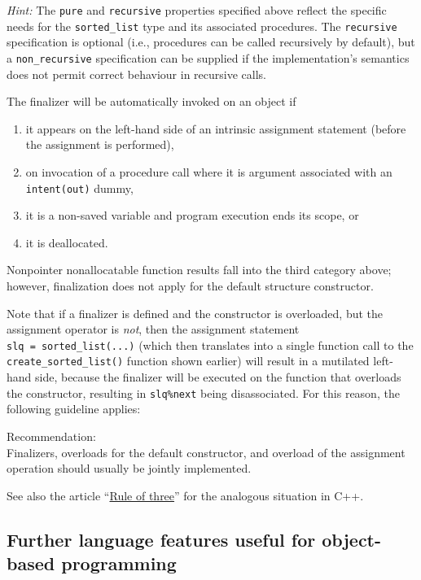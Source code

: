 \documentclass[
  paper=a4,
  ,captions=tableheading
]{scrartcl}
\providecommand{\tightlist}{%
  \setlength{\itemsep}{0pt}\setlength{\parskip}{0pt}}
\renewenvironment{quote}{\begin{customblockquote}\list{}{\rightmargin=0em\leftmargin=0em}%
\item\relax\color{blockquote-text}\ignorespaces}{\unskip\unskip\endlist\end{customblockquote}}
\begin{document}
\emph{Hint:} The \texttt{pure} and \texttt{recursive} properties
specified above reflect the specific needs for the \texttt{sorted\_list}
type and its associated procedures. The \texttt{recursive} specification
is optional (i.e., procedures can be called recursively by default), but
a \texttt{non\_recursive} specification can be supplied if the
implementation's semantics does not permit correct behaviour in
recursive calls.

The finalizer will be automatically invoked on an object if

\begin{enumerate}
\def\labelenumi{\arabic{enumi}.}
\tightlist
\item
  it appears on the left-hand side of an intrinsic assignment statement
  (before the assignment is performed),
\item
  on invocation of a procedure call where it is argument associated with
  an \texttt{intent(out)} dummy,
\item
  it is a non-saved variable and program execution ends its scope, or
\item
  it is deallocated.
\end{enumerate}

Nonpointer nonallocatable function results fall into the third category
above; however, finalization does not apply for the default structure
constructor.

Note that if a finalizer is defined and the constructor is overloaded,
but the assignment operator is \emph{not}, then the assignment statement
\texttt{slq\ =\ sorted\_list(...)} (which then translates into a single
function call to the \texttt{create\_sorted\_list()} function shown
earlier) will result in a mutilated left-hand side, because the
finalizer will be executed on the function that overloads the
constructor, resulting in \texttt{slq\%next} being disassociated. For
this reason, the following guideline applies:

\begin{quote}
Recommendation:\\
Finalizers, overloads for the default constructor, and overload of the
assignment operation should usually be jointly implemented.
\end{quote}

See also the article
``\href{https://en.wikipedia.org/wiki/Rule_of_three_(C\%2B\%2B_programming)}{Rule
of three}'' for the analogous situation in C++.

\subsection{Further language features useful for object-based
programming}\label{further-language-features-useful-for-object-based-programming}
\end{document}
